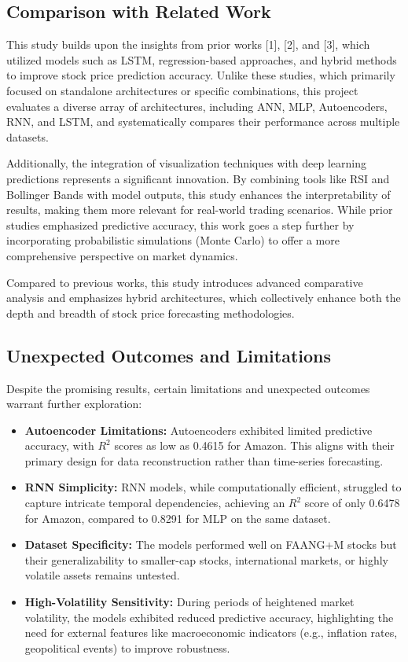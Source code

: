 \documentclass[conference]{IEEEtran}
\begin{document}
\subsection{Comparison with Related Work}

This study builds upon the insights from prior works [1], [2], and [3], which utilized models such as LSTM, regression-based approaches, and hybrid methods to improve stock price prediction accuracy. Unlike these studies, which primarily focused on standalone architectures or specific combinations, this project evaluates a diverse array of architectures, including ANN, MLP, Autoencoders, RNN, and LSTM, and systematically compares their performance across multiple datasets.

Additionally, the integration of visualization techniques with deep learning predictions represents a significant innovation. By combining tools like RSI and Bollinger Bands with model outputs, this study enhances the interpretability of results, making them more relevant for real-world trading scenarios. While prior studies emphasized predictive accuracy, this work goes a step further by incorporating probabilistic simulations (Monte Carlo) to offer a more comprehensive perspective on market dynamics.

Compared to previous works, this study introduces advanced comparative analysis and emphasizes hybrid architectures, which collectively enhance both the depth and breadth of stock price forecasting methodologies.

\subsection{Unexpected Outcomes and Limitations}

Despite the promising results, certain limitations and unexpected outcomes warrant further exploration: \begin{itemize} \item \textbf{Autoencoder Limitations:} Autoencoders exhibited limited predictive accuracy, with $R^2$ scores as low as 0.4615 for Amazon. This aligns with their primary design for data reconstruction rather than time-series forecasting. \item \textbf{RNN Simplicity:} RNN models, while computationally efficient, struggled to capture intricate temporal dependencies, achieving an $R^2$ score of only 0.6478 for Amazon, compared to 0.8291 for MLP on the same dataset. \item \textbf{Dataset Specificity:} The models performed well on FAANG+M stocks but their generalizability to smaller-cap stocks, international markets, or highly volatile assets remains untested. \item \textbf{High-Volatility Sensitivity:} During periods of heightened market volatility, the models exhibited reduced predictive accuracy, highlighting the need for external features like macroeconomic indicators (e.g., inflation rates, geopolitical events) to improve robustness. \end{itemize}
\end{document}
